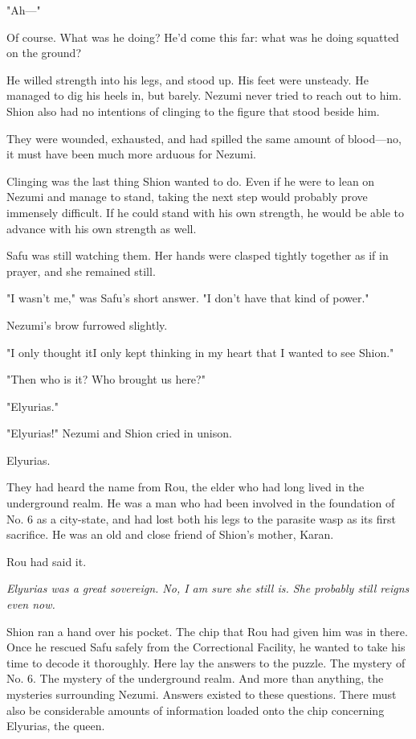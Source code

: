 "Ah---"

Of course. What was he doing? He'd come this far: what was he doing
squatted on the ground?

He willed strength into his legs, and stood up. His feet were unsteady.
He managed to dig his heels in, but barely. Nezumi never tried to reach
out to him. Shion also had no intentions of clinging to the figure that
stood beside him.

They were wounded, exhausted, and had spilled the same amount of
blood---no, it must have been much more arduous for Nezumi.

Clinging was the last thing Shion wanted to do. Even if he were to lean
on Nezumi and manage to stand, taking the next step would probably prove
immensely difficult. If he could stand with his own strength, he would
be able to advance with his own strength as well.

Safu was still watching them. Her hands were clasped tightly together as
if in prayer, and she remained still.

"I wasn't me," was Safu's short answer. "I don't have that kind of
power."

Nezumi's brow furrowed slightly.

"I only thought it\el I only kept thinking in my heart that I wanted to
see Shion."

"Then who is it? Who brought us here?"

"Elyurias."

"Elyurias!" Nezumi and Shion cried in unison.

Elyurias.

They had heard the name from Rou, the elder who had long lived in the
underground realm. He was a man who had been involved in the foundation
of No. 6 as a city-state, and had lost both his legs to the parasite
wasp as its first sacrifice. He was an old and close friend of Shion's
mother, Karan.

Rou had said it.

\emph{Elyurias was a great sovereign. No, I am sure she still is. She probably
still reigns even now.}

Shion ran a hand over his pocket. The chip that Rou had given him was in
there. Once he rescued Safu safely from the Correctional Facility, he
wanted to take his time to decode it thoroughly. Here lay the answers to
the puzzle. The mystery of No. 6. The mystery of the underground realm.
And more than anything, the mysteries surrounding Nezumi. Answers
existed to these questions. There must also be considerable amounts of
information loaded onto the chip concerning Elyurias, the queen.

